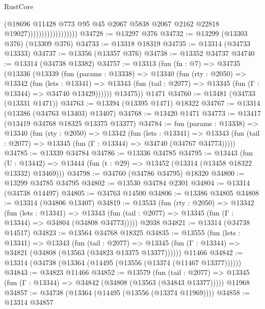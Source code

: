 \begin{lexlean}{RustCore}
\begin{coremodule}
                                      (@18696
                                        @11428
                                        @773
                                        @95
                                        @45
                                        @2067
                                        @5838
                                        @2067
                                        @2162
                                        @22818
                                        @19027))))))))))))))))))
@34728 := @13297 @376
@34732 := @13299 (@13303 @376) (@13309 @376)
@34733 := @13318 @18319
@34735 := @13314 (@34733 @13333)
@34737 := @13356 (@13357 @376)
@34738 := @13352 @34737
@34740 := @13314 (@34738 @13382)
@34757 := @13313
    (fun (fn : @7) =>
    @34735
      (@13336
        (@13339
          (fun (params : @13338) =>
          @13340
            (fun (rty : @2050) =>
            @13342
              (fun (lets : @13341) =>
              @13343 (fun (tail : @2077) => @13345 (fun (Γ : @13344) => @34740 @13429))))))
        @13475))
    @1471
@34760 := @13481 (@34733 (@13331 @1471))
@34763 := @13394 (@13395 @1471) @18322
@34767 := @13314 (@13386 (@34763 @13403) @13407)
@34768 := @13420 @1471
@34773 := @13417 (@13419 @34768 @18325 @13375 @13377)
@34784 := fun (params : @13338) =>
  @13340
    (fun (rty : @2050) =>
    @13342
      (fun (lets : @13341) =>
      @13343 (fun (tail : @2077) => @13345 (fun (Γ : @13344) => @34740 (@34767 @34773)))))
@34785 := @13339 @34784
@34786 := @13336 @34785
@34795 := @13443
    (fun (U : @13442) => @13444 (fun (t : @29) => @13452 (@13314 (@13458 @18322 @13332) @13469)))
@34798 := @34760 (@34786 @34795) @18320
@34800 := @13299 @34785 @34795
@34802 := @13530 @34784 @2301
@34804 := @13314 (@34738 @14497)
@34805 := @34763 @14500
@34806 := @13386 @34805
@34808 := @13314 (@34806 @13407)
@34819 := @13533
    (fun (rty : @2050) =>
    @13342
      (fun (lets : @13341) =>
      @13343 (fun (tail : @2077) => @13345 (fun (Γ : @13344) => @34804 (@34808 @34773)))))
    @2038
@34821 := @13314 (@34738 @14517)
@34823 := @13564 @34768 @18325
@34835 := @13555
    (fun (lets : @13341) =>
    @13343
      (fun (tail : @2077) =>
      @13345 (fun (Γ : @13344) => @34821 (@34808 (@13563 (@34823 @13375 @13377))))))
    @11466
@34842 := @13314 (@34738 (@13364 (@14495 (@13556 (@13374 (@11467 @13377))))))
@34843 := @34823 @11466
@34852 := @13579
    (fun (tail : @2077) => @13345 (fun (Γ : @13344) => @34842 (@34808 (@13563 (@34843 @13377)))))
    @11968
@34857 := @34738 (@13364 (@14495 (@13556 (@13374 @11969))))
@34858 := @13314 @34857

\end{coremodule}
\end{lexlean}
